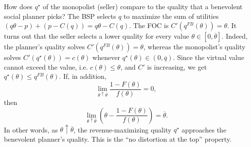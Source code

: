 How does $q^\star$ of the monopolist (seller) compare to the quality that a benevolent social planner picks? The BSP selects $q$ to maximize the sum of utilities $(q\theta - p) + (p - C(q)) = q\theta - C(q)$. The FOC is $C'(q^{FB}(\theta)) = \theta$.
It turns out that the seller selects a lower quality for every value $\theta \in [0,\overline{\theta}]$. 
Indeed, the planner's quality solves $C'(q^{FB}(\theta)) = \theta$, whereas the monopolist's quality solves $C'(q^\star(\theta)) = c(\theta)$ whenever $q^\star(\theta) \in (0,\overline{q})$. Since the virtual value cannot exceed the value, i.e. $c(\theta) \le \theta$, and $C'$ is increasing, we get $q^\star(\theta) \le q^{FB}(\theta)$.
If, in addition,
\[
	\lim_{\theta \uparrow \overline{\theta}} \frac{1-F(\theta)}{f(\theta)} = 0,
\]
then
\[
	\lim\limits_{\theta \uparrow \overline{\theta}} \left( \theta - \frac{1-F(\theta)}{f(\theta)} \right) = \overline{\theta}
.\] 
In other words, as $\theta \uparrow \overline{\theta}$, the revenue-maximizing quality $q^\star$ approaches the benevolent planner's quality. This is the ``no distortion at the top'' property.
